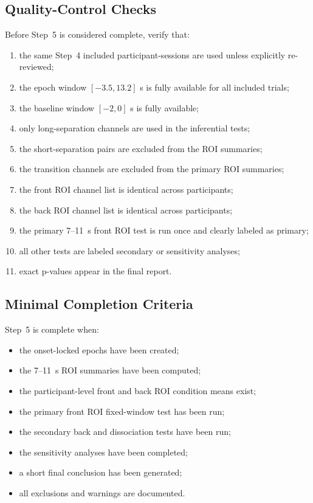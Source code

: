 \documentclass[11pt]{article}
\begin{document}
\subsection{Quality-Control Checks}
Before Step~5 is considered complete, verify that:
\begin{enumerate}
    \item the same Step~4 included participant-sessions are used unless explicitly re-reviewed;
    \item the epoch window \([-3.5, 13.2]\) s is fully available for all included trials;
    \item the baseline window \([-2, 0]\) s is fully available;
    \item only long-separation channels are used in the inferential tests;
    \item the short-separation pairs are excluded from the ROI summaries;
    \item the transition channels are excluded from the primary ROI summaries;
    \item the front ROI channel list is identical across participants;
    \item the back ROI channel list is identical across participants;
    \item the primary 7--11~s front ROI test is run once and clearly labeled as primary;
    \item all other tests are labeled secondary or sensitivity analyses;
    \item exact p-values appear in the final report.
\end{enumerate}

\subsection{Minimal Completion Criteria}
Step~5 is complete when:
\begin{itemize}
    \item the onset-locked epochs have been created;
    \item the 7--11~s ROI summaries have been computed;
    \item the participant-level front and back ROI condition means exist;
    \item the primary front ROI fixed-window test has been run;
    \item the secondary back and dissociation tests have been run;
    \item the sensitivity analyses have been completed;
    \item a short final conclusion has been generated;
    \item all exclusions and warnings are documented.
\end{itemize}
\end{document}

